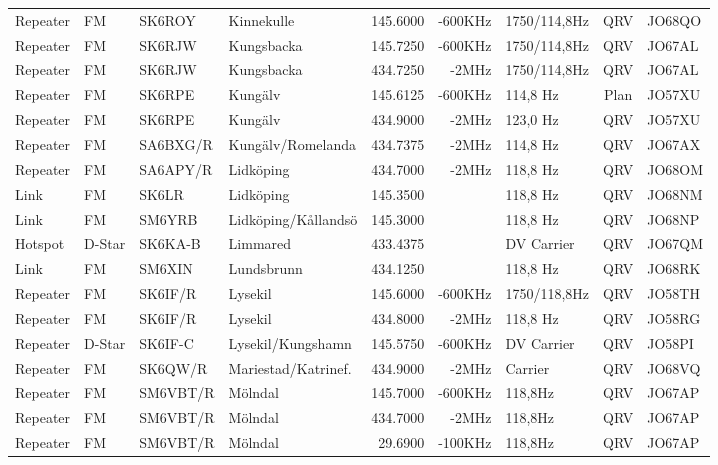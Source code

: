 \begin{landscape}
\begin{longtable}{llllrrlcl}
Repeater & FM     & SK6ROY   & Kinnekulle          & 145.6000  & -600KHz & 1750/114,8Hz    & QRV  & JO68QO \\
Repeater & FM     & SK6RJW   & Kungsbacka          & 145.7250  & -600KHz & 1750/114,8Hz    & QRV  & JO67AL \\
Repeater & FM     & SK6RJW   & Kungsbacka          & 434.7250  & -2MHz   & 1750/114,8Hz    & QRV  & JO67AL \\
Repeater & FM     & SK6RPE   & Kungälv             & 145.6125  & -600KHz & 114,8 Hz        & Plan & JO57XU \\
Repeater & FM     & SK6RPE   & Kungälv             & 434.9000  & -2MHz   & 123,0 Hz        & QRV  & JO57XU \\
Repeater & FM     & SA6BXG/R & Kungälv/Romelanda   & 434.7375  & -2MHz   & 114,8 Hz        & QRV  & JO67AX \\
Repeater & FM     & SA6APY/R & Lidköping           & 434.7000  & -2MHz   & 118,8 Hz        & QRV  & JO68OM \\
Link     & FM     & SK6LR    & Lidköping           & 145.3500  &         & 118,8 Hz        & QRV  & JO68NM \\
Link     & FM     & SM6YRB   & Lidköping/Kållandsö & 145.3000  &         & 118,8 Hz        & QRV  & JO68NP \\
Hotspot  & D-Star & SK6KA-B  & Limmared            & 433.4375  &         & DV Carrier      & QRV  & JO67QM \\
Link     & FM     & SM6XIN   & Lundsbrunn          & 434.1250  &         & 118,8 Hz        & QRV  & JO68RK \\
Repeater & FM     & SK6IF/R  & Lysekil             & 145.6000  & -600KHz & 1750/118,8Hz    & QRV  & JO58TH \\
Repeater & FM     & SK6IF/R  & Lysekil             & 434.8000  & -2MHz   & 118,8 Hz        & QRV  & JO58RG \\
Repeater & D-Star & SK6IF-C  & Lysekil/Kungshamn   & 145.5750  & -600KHz & DV Carrier      & QRV  & JO58PI \\
Repeater & FM     & SK6QW/R  & Mariestad/Katrinef. & 434.9000  & -2MHz   & Carrier         & QRV  & JO68VQ \\
Repeater & FM     & SM6VBT/R & Mölndal             & 145.7000  & -600KHz & 118,8Hz         & QRV  & JO67AP \\
Repeater & FM     & SM6VBT/R & Mölndal             & 434.7000  & -2MHz   & 118,8Hz         & QRV  & JO67AP \\
Repeater & FM     & SM6VBT/R & Mölndal             & 29.6900   & -100KHz & 118,8Hz         & QRV  & JO67AP \\

\end{longtable}
\end{landscape}
